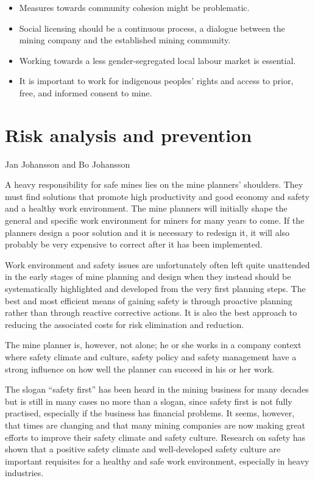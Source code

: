\documentclass[
  12pt,
]{scrbook}
\newenvironment{chap-auth}
{\vspace{1cm}\begin{center}\begin{flushright}\sffamily\noindent}
  {\end{flushright}\end{center}\vspace{1cm}}
\begin{document}
\begin{itemize}
\item
  Measures towards community cohesion might be problematic.
\item
  Social licensing should be a continuous process, a dialogue between the mining company and the established mining community.
\item
  Working towards a less gender-segregated local labour market is essential.
\item
  It is important to work for indigenous peoples' rights and access to prior, free, and informed consent to mine.
\end{itemize}

\hypertarget{risk-analysis-and-prevention}{%
\chapter{Risk analysis and prevention}\label{risk-analysis-and-prevention}}

\begin{chap-auth}
Jan Johansson and Bo Johansson
\end{chap-auth}

A heavy responsibility for safe mines lies on the mine planners' shoulders. They must find solutions that promote high productivity and good economy and safety and a healthy work environment. The mine planners will initially shape the general and specific work environment for miners for many years to come. If the planners design a poor solution and it is necessary to redesign it, it will also probably be very expensive to correct after it has been implemented.

Work environment and safety issues are unfortunately often left quite unattended in the early stages of mine planning and design when they instead should be systematically highlighted and developed from the very first planning steps. The best and most efficient means of gaining safety is through proactive planning rather than through reactive corrective actions. It is also the best approach to reducing the associated costs for risk elimination and reduction.

The mine planner is, however, not alone; he or she works in a company context where safety climate and culture, safety policy and safety management have a strong influence on how well the planner can succeed in his or her work.

The slogan ``safety first'' has been heard in the mining business for many decades but is still in many cases no more than a slogan, since safety first is not fully practised, especially if the business has financial problems. It seems, however, that times are changing and that many mining companies are now making great efforts to improve their safety climate and safety culture. Research on safety has shown that a positive safety climate and well-developed safety culture are important requisites for a healthy and safe work environment, especially in heavy industries.
\end{document}
